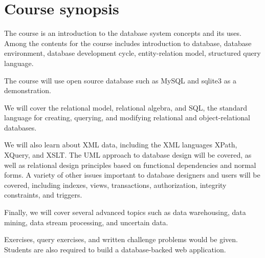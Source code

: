 \documentclass[12pt,a4paper]{article}
\begin{document}
\section{Course synopsis}

The course is an introduction to the database system concepts and its uses. Among the contents for the course includes introduction to database, database environment, database development cycle, entity-relation model, structured query language.

The course will use open source database such as MySQL and sqlite3 as a demonstration.

We will cover the relational model, relational algebra, and SQL, the standard language for creating, querying, and modifying relational and object-relational databases. 

We will also learn about XML data, including the XML languages XPath, XQuery, and XSLT. The UML approach to database design will be covered, as well as relational design principles based on functional dependencies and normal forms. A variety of other issues important to database designers and users will be covered, including indexes, views, transactions, authorization, integrity constraints, and triggers. 

Finally, we will cover several advanced topics such as data warehousing, data mining, data stream processing, and uncertain data.

Exercises, query exercises, and written challenge problems would be given. Students are also required to build a database-backed web application.

\section{}
\end{document}
